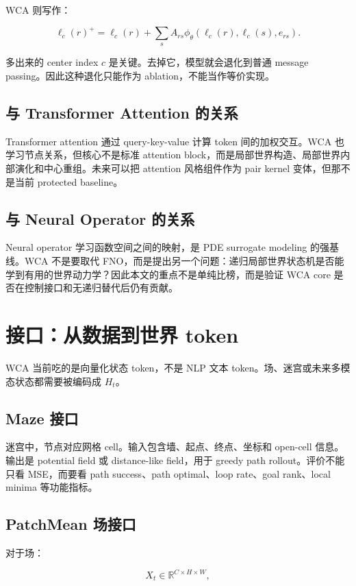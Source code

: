 \documentclass[11pt]{article}
\newcommand{\R}{\mathbb{R}}
\begin{document}
WCA 则写作：

\[
\ell_c(r)^{+}
=
\ell_c(r)
+
\sum_s A_{rs}\phi_\theta(\ell_c(r),\ell_c(s),e_{rs}).
\]

多出来的 center index $c$ 是关键。去掉它，模型就会退化到普通 message passing。因此这种退化只能作为 ablation，不能当作等价实现。

\subsection{与 Transformer Attention 的关系}

Transformer attention 通过 query-key-value 计算 token 间的加权交互。WCA 也学习节点关系，但核心不是标准 attention block，而是局部世界构造、局部世界内部演化和中心重组。未来可以把 attention 风格组件作为 pair kernel 变体，但那不是当前 protected baseline。

\subsection{与 Neural Operator 的关系}

Neural operator 学习函数空间之间的映射，是 PDE surrogate modeling 的强基线。WCA 不是要取代 FNO，而是提出另一个问题：递归局部世界状态机是否能学到有用的世界动力学？因此本文的重点不是单纯比榜，而是验证 WCA core 是否在控制接口和无递归替代后仍有贡献。

\section{接口：从数据到世界 token}

WCA 当前吃的是向量化状态 token，不是 NLP 文本 token。场、迷宫或未来多模态状态都需要被编码成 $H_t$。

\subsection{Maze 接口}

迷宫中，节点对应网格 cell。输入包含墙、起点、终点、坐标和 open-cell 信息。输出是 potential field 或 distance-like field，用于 greedy path rollout。评价不能只看 MSE，而要看 path success、path optimal、loop rate、goal rank、local minima 等功能指标。

\subsection{PatchMean 场接口}

对于场：

\[
X_t \in \R^{C \times H \times W},
\]
\end{document}
